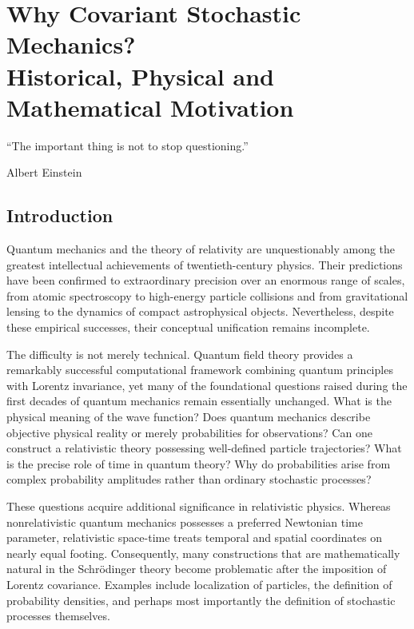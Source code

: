 
\chapter{Why Covariant Stochastic Mechanics?\\
Historical, Physical and Mathematical Motivation}

\epigraph{%
``The important thing is not to stop questioning.''%
}{Albert Einstein}

\section{Introduction}

Quantum mechanics and the theory of relativity are unquestionably among the
greatest intellectual achievements of twentieth-century physics. Their
predictions have been confirmed to extraordinary precision over an enormous
range of scales, from atomic spectroscopy to high-energy particle collisions
and from gravitational lensing to the dynamics of compact astrophysical
objects. Nevertheless, despite these empirical successes, their conceptual
unification remains incomplete.

The difficulty is not merely technical. Quantum field theory provides a
remarkably successful computational framework combining quantum principles
with Lorentz invariance, yet many of the foundational questions raised during
the first decades of quantum mechanics remain essentially unchanged.
What is the physical meaning of the wave function? Does quantum mechanics
describe objective physical reality or merely probabilities for observations?
Can one construct a relativistic theory possessing well-defined particle
trajectories? What is the precise role of time in quantum theory? Why do
probabilities arise from complex probability amplitudes rather than ordinary
stochastic processes?

These questions acquire additional significance in relativistic physics.
Whereas nonrelativistic quantum mechanics possesses a preferred Newtonian
time parameter, relativistic space-time treats temporal and spatial
coordinates on nearly equal footing. Consequently, many constructions that are
mathematically natural in the Schrödinger theory become problematic after the
imposition of Lorentz covariance. Examples include localization of particles,
the definition of probability densities, and perhaps most importantly the
definition of stochastic processes themselves.

